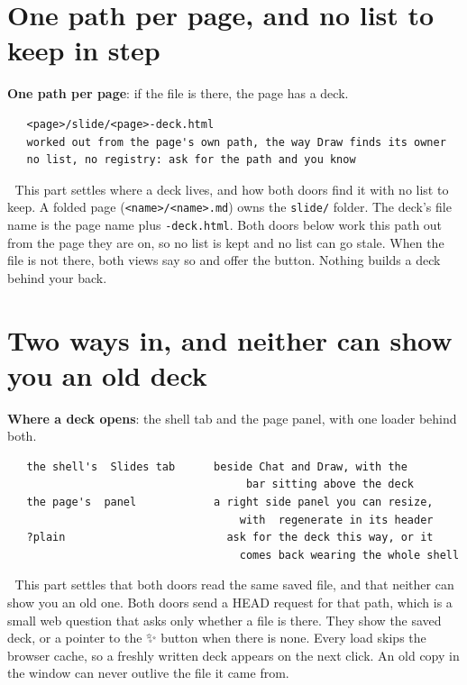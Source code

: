 
\section{One path per page, and no list to keep in step}
\textbf{One path per page}: if the file is there, the page has a deck.

\begin{verbatim}
   <page>/slide/<page>-deck.html
   worked out from the page's own path, the way Draw finds its owner
   no list, no registry: ask for the path and you know
\end{verbatim}
📌 This part settles where a deck lives, and how both doors find it with no list to keep. A folded page (\texttt{<name>/<name>.md}) owns the \texttt{slide/} folder. The deck's file name is the page name plus \texttt{-deck.html}. Both doors below work this path out from the page they are on, so no list is kept and no list can go stale. When the file is not there, both views say so and offer the button. Nothing builds a deck behind your back.


\section{Two ways in, and neither can show you an old deck}
\textbf{Where a deck opens}: the shell tab and the page panel, with one loader behind both.

\begin{verbatim}
   the shell's  Slides tab      beside Chat and Draw, with the
                                     bar sitting above the deck
   the page's  panel            a right side panel you can resize,
                                    with  regenerate in its header
   ?plain                         ask for the deck this way, or it
                                    comes back wearing the whole shell
\end{verbatim}
📌 This part settles that both doors read the same saved file, and that neither can show you an old one. Both doors send a HEAD request for that path, which is a small web question that asks only whether a file is there. They show the saved deck, or a pointer to the ✨ button when there is none. Every load skips the browser cache, so a freshly written deck appears on the next click. An old copy in the window can never outlive the file it came from.


